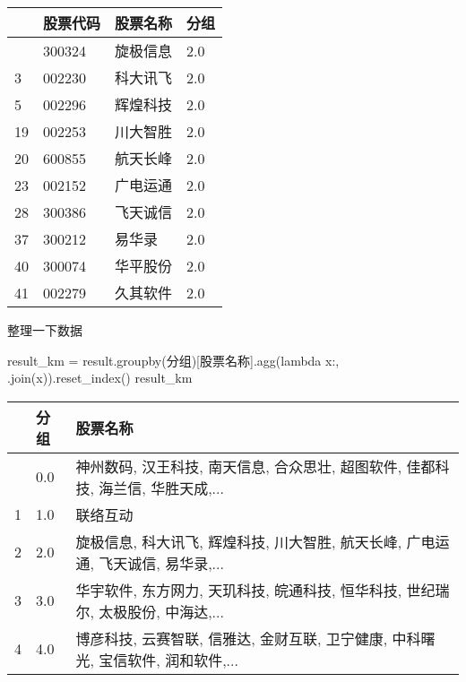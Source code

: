 \documentclass[
  letterpaper,
  DIV=11,
  numbers=noendperiod]{scrreprt}
\newenvironment{Shaded}{\begin{snugshade}}{\end{snugshade}}
\newcommand{\KeywordTok}[1]{\textcolor[rgb]{0.00,0.23,0.31}{#1}}
\newcommand{\NormalTok}[1]{\textcolor[rgb]{0.00,0.23,0.31}{#1}}
\newcommand{\OperatorTok}[1]{\textcolor[rgb]{0.37,0.37,0.37}{#1}}
\newcommand{\StringTok}[1]{\textcolor[rgb]{0.13,0.47,0.30}{#1}}
\begin{document}
\begin{longtable}[]{@{}llll@{}}
\toprule\noalign{}
& 股票代码 & 股票名称 & 分组 \\
\midrule\noalign{}
\endhead
\bottomrule\noalign{}
\endlastfoot
2 & 300324 & 旋极信息 & 2.0 \\
3 & 002230 & 科大讯飞 & 2.0 \\
5 & 002296 & 辉煌科技 & 2.0 \\
19 & 002253 & 川大智胜 & 2.0 \\
20 & 600855 & 航天长峰 & 2.0 \\
23 & 002152 & 广电运通 & 2.0 \\
28 & 300386 & 飞天诚信 & 2.0 \\
37 & 300212 & 易华录 & 2.0 \\
40 & 300074 & 华平股份 & 2.0 \\
41 & 002279 & 久其软件 & 2.0 \\
\end{longtable}

整理一下数据

\begin{Shaded}
\begin{Highlighting}[]
\NormalTok{result\_km }\OperatorTok{=}\NormalTok{ result.groupby(}\StringTok{\textquotesingle{}分组\textquotesingle{}}\NormalTok{)[}\StringTok{\textquotesingle{}股票名称\textquotesingle{}}\NormalTok{].agg(}\KeywordTok{lambda}\NormalTok{ x:}\StringTok{\textquotesingle{}, \textquotesingle{}}\NormalTok{.join(x)).reset\_index()}
\NormalTok{result\_km}
\end{Highlighting}
\end{Shaded}

\begin{longtable}[]{@{}lll@{}}
\toprule\noalign{}
& 分组 & 股票名称 \\
\midrule\noalign{}
\endhead
\bottomrule\noalign{}
\endlastfoot
0 & 0.0 & 神州数码, 汉王科技, 南天信息, 合众思壮, 超图软件, 佳都科技,
海兰信, 华胜天成,... \\
1 & 1.0 & 联络互动 \\
2 & 2.0 & 旋极信息, 科大讯飞, 辉煌科技, 川大智胜, 航天长峰, 广电运通,
飞天诚信, 易华录,... \\
3 & 3.0 & 华宇软件, 东方网力, 天玑科技, 皖通科技, 恒华科技, 世纪瑞尔,
太极股份, 中海达,... \\
4 & 4.0 & 博彦科技, 云赛智联, 信雅达, 金财互联, 卫宁健康, 中科曙光,
宝信软件, 润和软件,... \\
\end{longtable}
\end{document}

